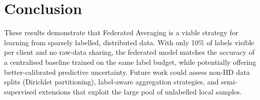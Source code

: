 \documentclass[11pt, a4paper]{article}
\begin{document}
\section*{Conclusion}

These results demonstrate that Federated Averaging is a viable strategy for
learning from sparsely labelled, distributed data.  With only 10\% of labels
visible per client and no raw-data sharing, the federated model matches the
accuracy of a centralised baseline trained on the same label budget, while
potentially offering better-calibrated predictive uncertainty.  Future work
could assess non-IID data splits (Dirichlet partitioning), label-aware
aggregation strategies, and semi-supervised extensions that exploit the
large pool of unlabelled local samples.
\end{document}
